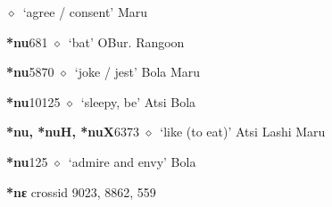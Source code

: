 \begin{list}{}{\leftmargin=1.5em \itemindent=-1.5em}
         $\diamond$~`agree / consent'
         Maru 
  \item {\footnotesize \textbf{*nu}}{\tiny 681}
\hspace{1ex}
         $\diamond$~`bat'
         OBur. 
\hspace{1ex}
         Rangoon 
  \item {\footnotesize \textbf{*nu}}{\tiny 5870}
\hspace{1ex}
         $\diamond$~`joke / jest'
         Bola 
\hspace{1ex}
         Maru 
  \item {\footnotesize \textbf{*nu}}{\tiny 10125}
\hspace{1ex}
         $\diamond$~`sleepy, be'
         Atsi 
\hspace{1ex}
         Bola 
  \item {\footnotesize \textbf{*nu, *nuH, *nuX}}{\tiny 6373}
\hspace{1ex}
         $\diamond$~`like (to eat)'
         Atsi 
\hspace{1ex}
         Lashi 
\hspace{1ex}
         Maru 
  \item {\footnotesize \textbf{*nu}}{\tiny 125}
\hspace{1ex}
         $\diamond$~`admire and envy'
         Bola 
  \end{list}
\item
\textbf{*nɛ}
  {\tiny crossid 9023, 8862, 559}
